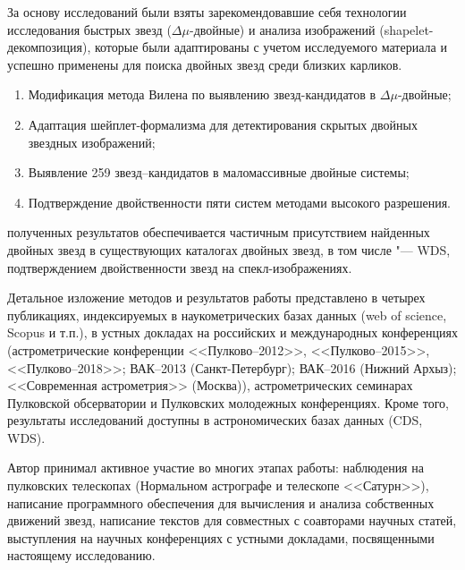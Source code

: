 {\methods} За основу исследований были взяты зарекомендовавшие себя технологии исследования быстрых звезд ($\Delta\mu$-двойные) и анализа изображений (shapelet-декомпозиция), которые были адаптированы с учетом исследуемого материала и успешно применены для поиска двойных звезд среди близких карликов.

{}
\begin{enumerate}
  \item Модификация метода Вилена по выявлению звезд-кандидатов в $\Delta\mu$-двойные;
  \item Адаптация шейплет-формализма для детектирования скрытых двойных звездных изображений;
  \item Выявление 259 звезд--кандидатов в маломассивные двойные системы;
  \item Подтверждение двойственности пяти систем методами высокого разрешения.
\end{enumerate}


{\reliability} полученных результатов обеспечивается частичным присутствием найденных двойных звезд в существующих каталогах двойных звезд, в том числе "--- WDS, подтверждением двойственности звезд на спекл-изображениях.


{\probation}
Детальное изложение методов и результатов работы представлено в четырех публикациях, индексируемых в наукометрических базах данных (web of science, Scopus и т.п.), в устных докладах на российских и международных конференциях (астрометрические конференции <<Пулково--2012>>, <<Пулково--2015>>, <<Пулково--2018>>; ВАК--2013 (Санкт-Петербург); ВАК--2016 (Нижний Архыз); <<Современная астрометрия>> (Москва)), астрометрических семинарах Пулковской обсерватории и Пулковских молодежных конференциях. Кроме того, результаты исследований доступны в астрономических базах данных (CDS, WDS).

{\contribution} Автор принимал активное участие во многих этапах работы: наблюдения на пулковских  телескопах (Нормальном астрографе и телескопе <<Сатурн>>), написание программного обеспечения для вычисления и анализа собственных движений звезд, написание текстов для совместных с соавторами научных статей, выступления на научных конференциях с устными докладами, посвященными настоящему исследованию. 


